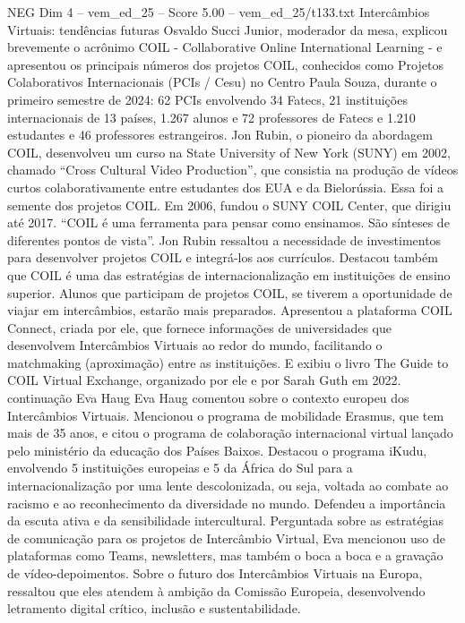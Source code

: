 \begin{textsample}{NEG Dim 4 – vem\_ed\_25 – Score 5.00 – vem\_ed\_25/t133.txt}  \label{ex:f4_neg_121}
Intercâmbios Virtuais: tendências futuras Osvaldo Succi Junior, moderador da mesa, explicou brevemente o acrônimo COIL - Collaborative Online International Learning - e apresentou os principais números dos projetos COIL, conhecidos como Projetos Colaborativos Internacionais (PCIs / Cesu) no Centro Paula Souza, durante o primeiro semestre de 2024: 62 PCIs envolvendo 34 Fatecs, 21 instituições internacionais de 13 países, 1.267 alunos e 72 professores de Fatecs e 1.210 estudantes e 46 professores estrangeiros.
Jon Rubin, o pioneiro da abordagem COIL, desenvolveu um curso na State University of New York (SUNY) em 2002, chamado “Cross Cultural Video Production”, que consistia na produção de vídeos curtos colaborativamente entre estudantes dos EUA e da Bielorússia.
Essa foi a semente dos projetos COIL.
Em 2006, fundou o SUNY COIL Center, que dirigiu até 2017. “COIL é uma ferramenta para pensar como ensinamos.
São sínteses de diferentes pontos de vista”.
Jon Rubin ressaltou a necessidade de investimentos para desenvolver projetos COIL e integrá-los aos currículos.
Destacou também que COIL é uma das estratégias de internacionalização em instituições de ensino superior.
Alunos que participam de projetos COIL, se tiverem a oportunidade de viajar em intercâmbios, estarão mais preparados.
Apresentou a plataforma COIL Connect, criada por ele, que fornece informações de universidades que desenvolvem Intercâmbios Virtuais ao redor do mundo, facilitando o matchmaking (aproximação) entre as instituições.
E exibiu o livro The Guide to COIL Virtual Exchange, organizado por ele e por Sarah Guth em 2022. continuação Eva Haug Eva Haug comentou sobre o contexto europeu dos Intercâmbios Virtuais.
Mencionou o programa de mobilidade Erasmus, que tem mais de 35 anos, e citou o programa de colaboração internacional virtual lançado pelo ministério da educação dos Países Baixos.
Destacou o programa iKudu, envolvendo 5 instituições europeias e 5 da África do Sul para a internacionalização por uma lente descolonizada, ou seja, voltada ao combate ao racismo e ao reconhecimento da diversidade no mundo.
Defendeu a importância da escuta ativa e da sensibilidade intercultural.
Perguntada sobre as estratégias de comunicação para os projetos de Intercâmbio Virtual, Eva mencionou uso de plataformas como Teams, newsletters, mas também o boca a boca e a gravação de vídeo-depoimentos.
Sobre o futuro dos Intercâmbios Virtuais na Europa, ressaltou que eles atendem à ambição da Comissão Europeia, desenvolvendo letramento digital crítico, inclusão e sustentabilidade.

\end{textsample}
